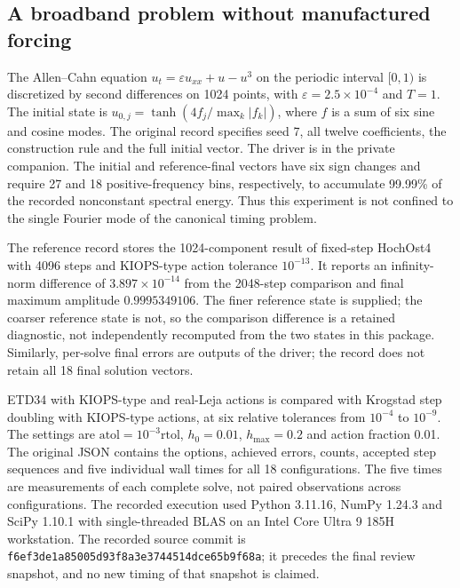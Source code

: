\subsection{A broadband problem without manufactured forcing}\label{sec:broadband}

The Allen--Cahn equation $u_t=\varepsilon u_{xx}+u-u^3$ on the periodic
interval $[0,1)$ is discretized by second differences on 1024 points, with
$\varepsilon=2.5\times10^{-4}$ and $T=1$.  The initial state is
$u_{0,j}=\tanh(4f_j/\max_k|f_k|)$, where $f$ is a sum of six sine and cosine
modes.  The original record specifies seed 7, all twelve coefficients,
the construction rule and the full initial vector.  The driver is
 in the private companion.
The initial and reference-final vectors have six sign changes and require
27 and 18 positive-frequency bins, respectively, to accumulate 99.99\% of
the recorded nonconstant spectral energy.  Thus this experiment is not
confined to the single Fourier mode of the canonical timing problem.

The reference record stores the 1024-component result of fixed-step
HochOst4 with 4096 steps and KIOPS-type action tolerance $10^{-13}$.
It reports an infinity-norm difference of $3.897\times10^{-14}$ from the
2048-step comparison and final maximum amplitude $0.9995349106$.
The finer reference state is supplied; the coarser reference state is not,
so the comparison difference is a retained diagnostic, not independently
recomputed from the two states in this package.  Similarly, per-solve final
errors are outputs of the driver; the record does not retain all 18 final
solution vectors.

ETD34 with KIOPS-type and real-Leja actions is compared with Krogstad step
doubling with KIOPS-type actions, at six relative tolerances from $10^{-4}$
to $10^{-9}$.  The settings are $\mathrm{atol}=10^{-3}\mathrm{rtol}$,
$h_0=0.01$, $h_{\max}=0.2$ and action fraction 0.01.  The original JSON
contains the options, achieved errors, counts, accepted step sequences and
five individual wall times for all 18 configurations.  The five times are
measurements of each complete solve, not paired observations across
configurations.  The recorded execution used Python 3.11.16, NumPy 1.24.3
and SciPy 1.10.1 with single-threaded BLAS on an Intel Core Ultra 9 185H
workstation.  The recorded source commit is
\texttt{f6ef3de1a85005d93f8a3e3744514dce65b9f68a}; it precedes the final
review snapshot, and no new timing of that snapshot is claimed.

